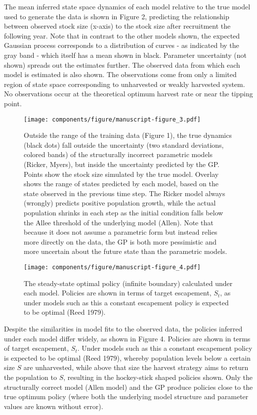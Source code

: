 \documentclass[author-year, 12pt,review]{elsarticle} %
\makeatletter
\def\maxwidth{\ifdim\Gin@nat@width>\linewidth\linewidth
\else\Gin@nat@width\fi}
\let\Oldincludegraphics\includegraphics
\renewcommand{\includegraphics}[1]{\Oldincludegraphics[width=\maxwidth]{#1}}
\makeatother
\begin{document}
The mean inferred state space dynamics of each model relative to the
true model used to generate the data is shown in Figure 2, predicting
the relationship between observed stock size (x-axis) to the stock size
after recruitment the following year. Note that in contrast to the other
models shown, the expected Gaussian process corresponds to a
distribution of curves - as indicated by the gray band - which itself
has a mean shown in black. Parameter uncertainty (not shown) spreads out
the estimates further. The observed data from which each model is
estimated is also shown. The observations come from only a limited
region of state space corresponding to unharvested or weakly harvested
system. No observations occur at the theoretical optimum harvest rate or
near the tipping point.

\begin{figure}[htbp]
\centering
\texttt{[image: components/figure/manuscript-figure\_3.pdf]}
\caption{Outside the range of the training data (Figure 1), the true
dynamics (black dots) fall outside the uncertainty (two standard
deviations, colored bands) of the structurally incorrect parametric
models (Ricker, Myers), but inside the uncertainty predicted by the GP.
Points show the stock size simulated by the true model. Overlay shows
the range of states predicted by each model, based on the state observed
in the previous time step. The Ricker model always (wrongly) predicts
positive population growth, while the actual population shrinks in each
step as the initial condition falls below the Allee threshold of the
underlying model (Allen). Note that because it does not assume a
parametric form but instead relies more directly on the data, the GP is
both more pessimistic and more uncertain about the future state than the
parametric models.}
\end{figure}

\begin{figure}[htbp]
\centering
\texttt{[image: components/figure/manuscript-figure\_4.pdf]}
\caption{The steady-state optimal policy (infinite boundary) calculated
under each model. Policies are shown in terms of target escapement,
$S_t$, as under models such as this a constant escapement policy is
expected to be optimal (Reed 1979).}
\end{figure}

Despite the similarities in model fits to the observed data, the
policies inferred under each model differ widely, as shown in Figure 4.
Policies are shown in terms of target escapement, $S_t$. Under models
such as this a constant escapement policy is expected to be optimal
(Reed 1979), whereby population levels below a certain size $S$ are
unharvested, while above that size the harvest strategy aims to return
the population to $S$, resulting in the hockey-stick shaped policies
shown. Only the structurally correct model (Allen model) and the GP
produce policies close to the true optimum policy (where both the
underlying model structure and parameter values are known without
error).
\end{document}
